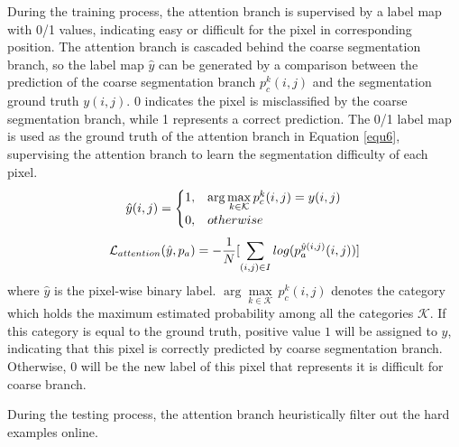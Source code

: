 \documentclass[10.5pt,compsoc]{TsT}
\theoremstyle{mystyle}
\begin{document}
{During the training process, the attention branch is supervised by a label map with 0/1 values, indicating  easy or difficult for the pixel in corresponding position. The attention branch is cascaded behind the coarse segmentation branch, so the label map $\hat{y}$ can be generated by a comparison between the prediction of the coarse segmentation branch $p_{c}^k(i,j)$ and the segmentation ground truth $y(i,j)$. 0 indicates the pixel is misclassified by the coarse segmentation branch, while 1 represents a correct prediction. The 0/1 label map is used as the ground truth of the attention branch in Equation \ref{equ6}, supervising the attention branch to learn the segmentation difficulty of each pixel.
\begin{equation}\label{equ5}
\setlength\abovedisplayskip{8pt}
\setlength\belowdisplayskip{8pt}
\begin{split}
\hat{y}(i,j) = 
\begin{cases}
1, &\arg\underset{k \in \mathcal{K}}{\max}\,p_{c}^k(i,j)=y(i,j)\\
0, &otherwise
\end{cases}
\end{split}
\end{equation} 
\begin{equation}\label{equ6}
\setlength\abovedisplayskip{8pt}
\setlength\belowdisplayskip{8pt}
\begin{split}
\mathcal{L}_{attention}(\hat{y}, p_a) = - \frac{1}{N}[\sum_{(i,j)\in I}log(p^{\hat{y}(i,j)}_a(i,j))]\\
\end{split}
\end{equation}
where $\hat{y}$ is the pixel-wise binary label. $\arg\underset{k \in \mathcal{K}}{\max}\,p_{c}^k(i,j)$ denotes the category which holds the maximum estimated probability among all the categories $\mathcal{K}$. If this category is equal to the ground truth, positive value $1$ will be assigned to $\hat{y}$, indicating that this pixel is correctly predicted by coarse segmentation branch. Otherwise, $0$ will be the new label of this pixel that represents it is difficult for coarse branch.

During the testing process, the attention branch heuristically filter out the hard examples online.



}
\end{document}

